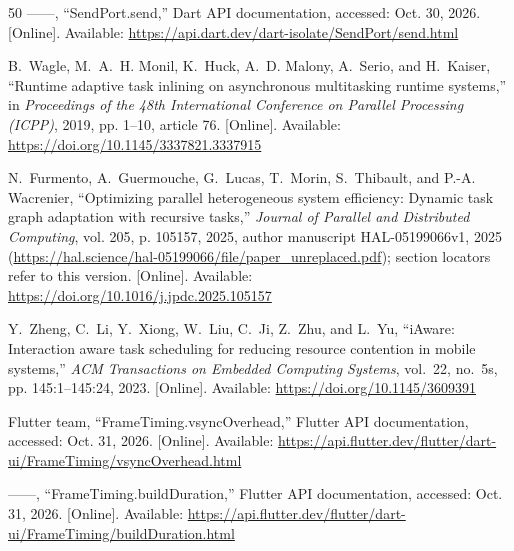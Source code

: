 \documentclass[14pt,a4paper,oneside]{extreport}
\begin{document}
\begin{thebibliography}{50}
\BIBentryALTinterwordspacing
------, ``{SendPort.send},'' Dart API documentation, accessed: Oct. 30, 2026.
  [Online]. Available:
  \url{https://api.dart.dev/dart-isolate/SendPort/send.html}
\BIBentrySTDinterwordspacing

\BIBentryALTinterwordspacing
B.~Wagle, M.~A.~H. Monil, K.~Huck, A.~D. Malony, A.~Serio, and H.~Kaiser,
  ``Runtime adaptive task inlining on asynchronous multitasking runtime
  systems,'' in \emph{Proceedings of the 48th International Conference on
  Parallel Processing (ICPP)}, 2019, pp. 1--10, article 76. [Online].
  Available: \url{https://doi.org/10.1145/3337821.3337915}
\BIBentrySTDinterwordspacing

\BIBentryALTinterwordspacing
N.~Furmento, A.~Guermouche, G.~Lucas, T.~Morin, S.~Thibault, and P.-A.
  Wacrenier, ``Optimizing parallel heterogeneous system efficiency: Dynamic
  task graph adaptation with recursive tasks,'' \emph{Journal of Parallel and
  Distributed Computing}, vol. 205, p. 105157, 2025, author manuscript
  HAL-05199066v1, 2025
  (\url{https://hal.science/hal-05199066/file/paper_unreplaced.pdf}); section
  locators refer to this version. [Online]. Available:
  \url{https://doi.org/10.1016/j.jpdc.2025.105157}
\BIBentrySTDinterwordspacing

\BIBentryALTinterwordspacing
Y.~Zheng, C.~Li, Y.~Xiong, W.~Liu, C.~Ji, Z.~Zhu, and L.~Yu, ``{iAware}:
  Interaction aware task scheduling for reducing resource contention in mobile
  systems,'' \emph{ACM Transactions on Embedded Computing Systems}, vol.~22,
  no.~5s, pp. 145:1--145:24, 2023. [Online]. Available:
  \url{https://doi.org/10.1145/3609391}
\BIBentrySTDinterwordspacing

\BIBentryALTinterwordspacing
{Flutter team}, ``{FrameTiming.vsyncOverhead},'' Flutter API documentation,
  accessed: Oct. 31, 2026. [Online]. Available:
  \url{https://api.flutter.dev/flutter/dart-ui/FrameTiming/vsyncOverhead.html}
\BIBentrySTDinterwordspacing

\BIBentryALTinterwordspacing
------, ``{FrameTiming.buildDuration},'' Flutter API documentation, accessed:
  Oct. 31, 2026. [Online]. Available:
  \url{https://api.flutter.dev/flutter/dart-ui/FrameTiming/buildDuration.html}
\BIBentrySTDinterwordspacing


\end{thebibliography}
\end{document}
